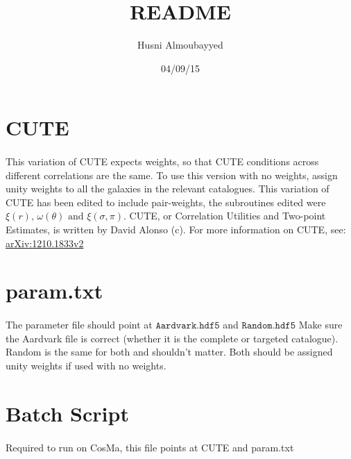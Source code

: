 \documentclass[11pt, oneside]{article}   	%
\title{README}
\author{{\small Husni Almoubayyed}}
\date{04/09/15}							%
\begin{document}
\maketitle
\section{CUTE}
\paragraph{}This variation of CUTE expects weights, so that CUTE conditions across different correlations are the same. To use this version with no weights, assign unity weights to all the galaxies in the relevant catalogues.
\break
\break
\noindent{} This variation of CUTE has been edited to include pair-weights, the subroutines edited were $\xi(r), \, \omega(\theta) \, \,\textrm{and} \, \, \xi(\sigma, \pi)$.
\break
\break
\noindent{} CUTE, or Correlation Utilities and Two-point Estimates, is written by David Alonso (c). For more information on CUTE, see: \href{arXiv:1210.1833v2}{arXiv:1210.1833v2}


\section{param.txt}
\paragraph{} The parameter file should point at $\mathtt{Aardvark.hdf5}$ and $\mathtt{Random.hdf5}$
Make sure the Aardvark file is correct (whether it is the complete or targeted catalogue). Random is the same for both and shouldn't matter. Both should be assigned unity weights if used with no weights.

\section{Batch Script}
\paragraph{} Required to run on CosMa, this file points at CUTE and param.txt
\end{document}
